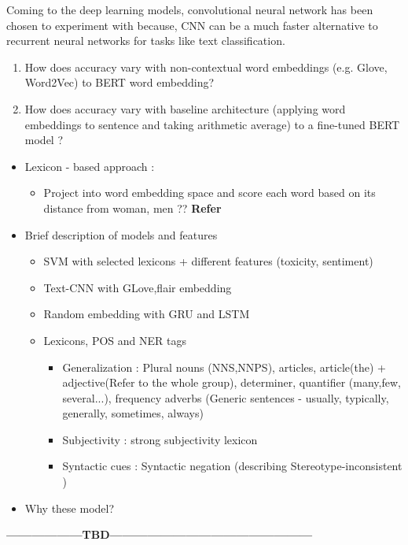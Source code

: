 Coming to the deep learning models, convolutional neural network has been chosen to experiment with because, CNN can be a much faster alternative to recurrent neural networks for tasks like text classification. 
\begin{enumerate}
    \item How does accuracy vary with non-contextual word embeddings (e.g. Glove, Word2Vec) to BERT word embedding?
    \item How does accuracy vary with baseline architecture (applying word embeddings to sentence and taking arithmetic average) to a fine-tuned BERT model ?
\end{enumerate}

    \begin{itemize}
        \item Lexicon - based approach : 
        \begin{itemize}
            \item Project into word embedding space and score each word based on its distance from woman, men ??
            \textbf{Refer }\cite{cryan2020detecting}
        \end{itemize}
        \item Brief description of  models and features
        \begin{itemize}
            \item SVM with selected lexicons + different features (toxicity, sentiment)
            \item Text-CNN with GLove,flair embedding
            \item Random embedding with GRU and LSTM 
        \end{itemize}
        \begin{itemize}
            \item Lexicons, POS and NER tags 
            \begin{itemize}
                \item Generalization : Plural nouns (NNS,NNPS), articles, article(the) + adjective(Refer to the whole group), determiner, quantifier (many,few, several...), frequency adverbs (Generic sentences - usually, typically, generally, sometimes, always)
                \item Subjectivity : strong subjectivity lexicon \cite{tangpersonalized}
                \item Syntactic cues : Syntactic negation (describing Stereotype-inconsistent )
            \end{itemize}
        \end{itemize}
        \item Why these model?
    \end{itemize}
\textbf{------------------TBD------------------------------------------------}

